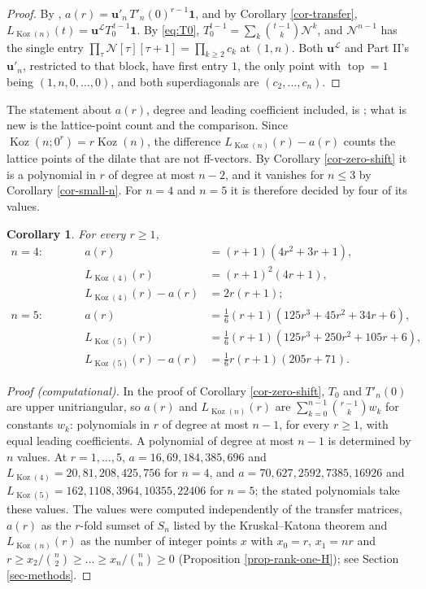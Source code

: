 \documentclass[11pt, a4paper, abstract=yes]{scrartcl}
\theoremstyle{definition}
\theoremstyle{remark}
\theoremstyle{plain}
\newtheorem{corollary}[definition]{Corollary}
\newcommand{\vek}[1]{\boldsymbol{#1}}
\theoremstyle{remark}
\theoremstyle{plain}
\newcommand{\Koz}{\operatorname{Koz}}
\newcommand{\tp}{\operatorname{top}}
\newcommand{\leannone}{\tikz[baseline=-0.6ex]\draw[leannone,line width=0.6pt] (0,0) circle (0.55ex);}
\newcommand{\leanmark}[1]{\leavevmode{\reversemarginpar\marginnote{\raggedleft#1}}}
\begin{document}
\begin{proof}
By \autocite[Theorem 41]{SnellmanArticle2}, \(a(r)=\vek u'_n\,T'_n(0)^{r-1}\vek 1\), and by
Corollary \ref{cor-transfer}, \(L_{\Koz(n)}(t)=\vek u^{\mathcal L}T_0^{\,t-1}\vek 1\).
By \eqref{eq:T0}, \(T_0^{t-1}=\sum_k\binom{t-1}k\mathcal N^k\), and \(\mathcal N^{n-1}\) has the single entry
\(\prod_\tau\mathcal N[\tau][\tau+1]=\prod_{k\ge2}c_k\) at \((1,n)\). Both \(\vek u^{\mathcal L}\) and
Part II's \(\vek u'_n\), restricted to that block, have first entry \(1\), the only point with \(\tp=1\) being \((1,n,0,\dots,0)\),
and both superdiagonals are \((c_2,\dots,c_n)\).
\end{proof}

The statement about \(a(r)\), degree and leading coefficient included, is
\autocite[Theorem 36]{SnellmanArticle2}; what is new is the lattice-point count and the comparison.
Since \(\Koz(n;0^r)=r\Koz(n)\), the difference \(L_{\Koz(n)}(r)-a(r)\) counts the lattice points of
the dilate that are not ff-vectors. By Corollary \ref{cor-zero-shift} it is a polynomial in \(r\) of degree at most
\(n-2\), and it vanishes for \(n\le3\) by Corollary \ref{cor-small-n}. For \(n=4\) and \(n=5\) it
is therefore decided by four of its values.

\begin{corollary}
\leanmark{\leannone}For every \(r\ge1\),
\[
  \begin{alignedat}{2}
  n=4:&\qquad& a(r)&=(r+1)(4r^2+3r+1),\\
      &&       L_{\Koz(4)}(r)&=(r+1)^2(4r+1),\\
      &&       L_{\Koz(4)}(r)-a(r)&=2r(r+1);\\[4pt]
  n=5:&&       a(r)&=\tfrac16(r+1)(125r^3+45r^2+34r+6),\\
      &&       L_{\Koz(5)}(r)&=\tfrac16(r+1)(125r^3+250r^2+105r+6),\\
      &&       L_{\Koz(5)}(r)-a(r)&=\tfrac16r(r+1)(205r+71).
  \end{alignedat}
\]
\label{cor-deficiency}
\end{corollary}

\begin{proof}[Proof (computational)]
In the proof of Corollary \ref{cor-zero-shift}, \(T_0\) and \(T'_n(0)\) are upper unitriangular, so
\(a(r)\) and \(L_{\Koz(n)}(r)\) are \(\sum_{k=0}^{n-1}\binom{r-1}k w_k\) for constants \(w_k\): polynomials
in \(r\) of degree at most \(n-1\), for every \(r\ge1\), with equal leading coefficients. A polynomial
of degree at most \(n-1\) is determined by \(n\) values. At \(r=1,\dots,5\),
\(a=16,69,184,385,696\) and \(L_{\Koz(4)}=20,81,208,425,756\) for \(n=4\), and
\(a=70,627,2592,7385,16926\) and \(L_{\Koz(5)}=162,1108,3964,10355,22406\) for \(n=5\); the stated
polynomials take these values. The values were computed independently of the transfer matrices,
\(a(r)\) as the \(r\)-fold sumset of \(S_n\) listed by the Kruskal--Katona theorem and
\(L_{\Koz(n)}(r)\) as the number of integer points \(x\) with \(x_0=r\), \(x_1=nr\) and
\(r\ge x_2/\binom n2\ge\dots\ge x_n/\binom nn\ge0\) (Proposition \ref{prop-rank-one-H}); see
Section \ref{sec-methods}.
\end{proof}
\end{document}
